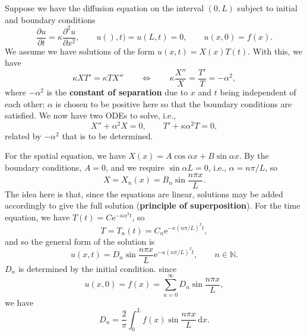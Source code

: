 \documentclass[letter-paper]{tufte-book}
\newcommand{\dy}{\partial}
\newcommand{\ddy}[2]{\frac{\dy#1}{\dy#2}}
\newcommand{\ex}{\mathrm{e}}
\newcommand\Def[1]{\textbf{#1}}
\begin{document}
Suppose we have the diffusion equation on the interval $(0,L)$ subject to
initial and boundary conditions
\begin{equation*}
  \ddy{u}{t} = \kappa\ddy{^2 u}{x^2},\qquad u(),t) = u(L,t) = 0,\qquad
  u(x,0) = f(x).
\end{equation*}
We assume we have solutions of the form $u(x,t) = X(x) T(t)$. With this, we have
\begin{equation*}
  \kappa X T' = \kappa T X'' \qquad\Leftrightarrow\qquad
  \kappa\frac{X''}{X} = \frac{T'}{T} = -\alpha^2,
\end{equation*}
where $-\alpha^2$ is the \Def{constant of separation} due to $x$ and $t$
being independent of each other; $\alpha$ is chosen to be positive here so that
the boundary conditions are satisfied. We now have two ODEs to solve, i.e.,
\begin{equation*}
  X'' + \alpha^2 X = 0,\qquad T' + \kappa\alpha^2 T = 0,
\end{equation*}
related by $-\alpha^2$ that is to be determined.

For the spatial equation, we have $X(x) = A\cos\alpha x + B\sin\alpha x$. By the
boundary conditions, $A=0$, and we require $\sin\alpha L = 0$, i.e., $\alpha =
n\pi/ L$, so
\begin{equation*}
  X = X_n(x) = B_n \sin\frac{n\pi x}{L}.
\end{equation*}
The idea here is that, since the equations are linear, solutions may be added
accordingly to give the full solution (\Def{principle of superposition}).
For the time equation, we have $T(t) = C\ex^{-\kappa\alpha^2 t}$, so
\begin{equation*}
  T = T_n(t) = C_n \ex^{-\kappa(n\pi/L)^2 t},
\end{equation*}
and so the general form of the solution is
\begin{equation*}
  u(x,t) = D_n \sin\frac{n\pi x}{L} \ex^{-\kappa(n\pi/L)^2 t},\qquad
  n\in\mathbb{N}.
\end{equation*}
$D_n$ is determined by the initial condition. since
\begin{equation*}
  u(x,0) = f(x) = \sum_{n=0}^\infty D_n\sin\frac{n\pi x}{L},
\end{equation*}
we have
\begin{equation*}
  D_n = \frac{2}{\pi} \int_0^L f(x)\sin\frac{n\pi x}{L}\, \mathrm{d}x.
\end{equation*}
\end{document}
